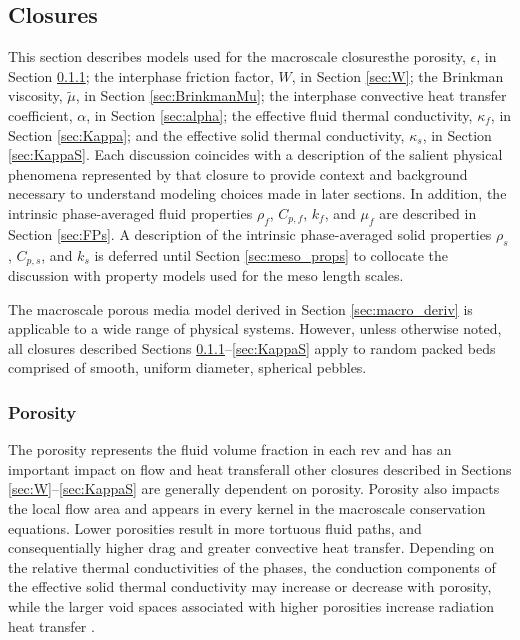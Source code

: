 \subsection{Closures}
\label{sec:Closures}

This section describes models used for the macroscale closures\mdash the porosity, \(\epsilon\), in Section \ref{sec:Porosity}; the interphase friction factor, \(W\), in Section \ref{sec:W}; the Brinkman viscosity, \(\tilde{\mu}\), in Section \ref{sec:BrinkmanMu}; the interphase convective heat transfer coefficient, \(\alpha\), in Section \ref{sec:alpha}; the effective fluid thermal conductivity, \(\kappa_f\), in Section \ref{sec:Kappa}; and the effective solid thermal conductivity, \(\kappa_s\), in Section \ref{sec:KappaS}. Each discussion coincides with a description of the salient physical phenomena represented by that closure to provide context and background necessary to understand modeling choices made in later sections. In addition, the intrinsic phase-averaged fluid properties \(\rho_f\), \(C_{p,f}\), \(k_f\), and \(\mu_f\) are described in Section \ref{sec:FPs}. A description of the intrinsic phase-averaged solid properties \(\rho_s\), \(C_{p,s}\), and \(k_s\) is deferred until Section \ref{sec:meso_props} to collocate the discussion with property models used for the meso length scales.

The macroscale porous media model derived in Section \ref{sec:macro_deriv} is applicable to a wide range of physical systems. However, unless otherwise noted, all closures described Sections \ref{sec:Porosity}--\ref{sec:KappaS} apply to random packed beds comprised of smooth, uniform diameter, spherical pebbles.

\subsubsection{Porosity}
\label{sec:Porosity}

The porosity represents the fluid volume fraction in each \gls{rev} and has an important impact on flow and heat transfer\mdash all other closures described in Sections \ref{sec:W}--\ref{sec:KappaS} are generally dependent on porosity. Porosity also impacts the local flow area and appears in every kernel in the macroscale conservation equations. Lower porosities result in more tortuous fluid paths, and consequentially higher drag and greater convective heat transfer. Depending on the relative thermal conductivities of the phases, the conduction components of the effective solid thermal conductivity may increase or decrease with porosity, while the larger void spaces associated with higher porosities increase radiation heat transfer \cite{you}. 

